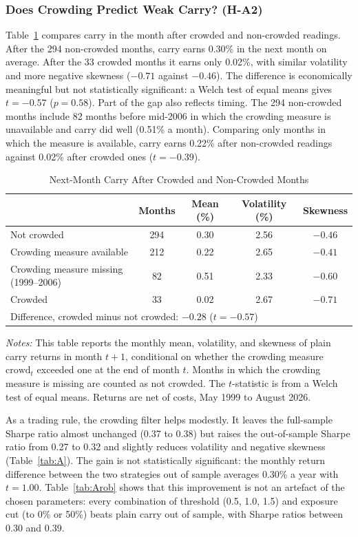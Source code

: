 \documentclass[11pt]{article}
\newcommand{\tabnote}[1]{\par\vspace{0.3em}\begin{minipage}{\linewidth}\footnotesize\setstretch{1.0}\textit{Notes:} #1\end{minipage}}
\begin{document}
\subsubsection{Does Crowding Predict Weak Carry? (H-A2)}

Table~\ref{tab:crowd} compares carry in the month after crowded and non-crowded readings. After the 294 non-crowded months, carry earns 0.30\% in the next month on average. After the 33 crowded months it earns only 0.02\%, with similar volatility and more negative skewness ($-0.71$ against $-0.46$). The difference is economically meaningful but not statistically significant: a Welch test of equal means gives $t=-0.57$ ($p=0.58$). Part of the gap also reflects timing. The 294 non-crowded months include 82 months before mid-2006 in which the crowding measure is unavailable and carry did well (0.51\% a month). Comparing only months in which the measure is available, carry earns 0.22\% after non-crowded readings against 0.02\% after crowded ones ($t=-0.39$).

\begin{table}[!htbp]
\centering
\caption{Next-Month Carry After Crowded and Non-Crowded Months}\label{tab:crowd}
\small
\begin{tabular}{lcccc}
\toprule
 & Months & Mean (\%) & Volatility (\%) & Skewness \\
\midrule
Not crowded & 294 & 0.30 & 2.56 & $-0.46$ \\
\quad Crowding measure available & 212 & 0.22 & 2.65 & $-0.41$ \\
\quad Crowding measure missing (1999--2006) & 82 & 0.51 & 2.33 & $-0.60$ \\
Crowded & 33 & 0.02 & 2.67 & $-0.71$ \\
\midrule
\multicolumn{5}{l}{Difference, crowded minus not crowded: $-0.28$ ($t=-0.57$)} \\
\bottomrule
\end{tabular}
\tabnote{This table reports the monthly mean, volatility, and skewness of plain carry returns in month $t+1$, conditional on whether the crowding measure $\text{crowd}_t$ exceeded one at the end of month $t$. Months in which the crowding measure is missing are counted as not crowded. The $t$-statistic is from a Welch test of equal means. Returns are net of costs, May 1999 to August 2026.}
\end{table}

As a trading rule, the crowding filter helps modestly. It leaves the full-sample Sharpe ratio almost unchanged (0.37 to 0.38) but raises the out-of-sample Sharpe ratio from 0.27 to 0.32 and slightly reduces volatility and negative skewness (Table~\ref{tab:A}). The gain is not statistically significant: the monthly return difference between the two strategies out of sample averages 0.30\% a year with $t=1.00$. Table~\ref{tab:Arob} shows that this improvement is not an artefact of the chosen parameters: every combination of threshold (0.5, 1.0, 1.5) and exposure cut (to 0\% or 50\%) beats plain carry out of sample, with Sharpe ratios between 0.30 and 0.39.
\end{document}
